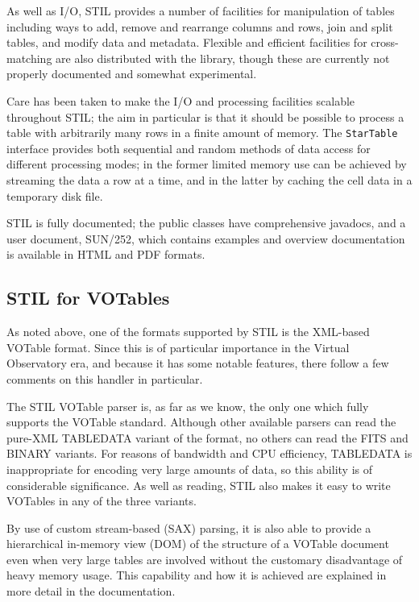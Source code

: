 \documentclass[11pt,twoside]{article}  %
\begin{document}
As well as I/O, STIL provides a number of facilities for manipulation 
of tables including ways to add, remove and rearrange columns and rows,
join and split tables, and modify data and metadata.
Flexible and efficient facilities for cross-matching are also distributed
with the library, though these are currently not properly documented
and somewhat experimental.

Care has been taken to make the I/O and processing facilities scalable
throughout STIL; the aim in particular is that it should be possible 
to process a table with arbitrarily many rows in a finite amount of memory.  
The {\tt StarTable} interface provides both sequential and random
methods of data access for different processing modes; 
in the former limited memory use can be achieved
by streaming the data a row at a time, and in the latter by
caching the cell data in a temporary disk file.

STIL is fully documented; the public classes have comprehensive javadocs,
and a user document, SUN/252, which contains examples and overview
documentation is available in HTML and PDF formats.

\subsection{STIL for VOTables}

As noted above, one of the formats supported by STIL is the XML-based
VOTable format.  Since this is of particular importance in the Virtual
Observatory era, and because it has some notable features, there follow
a few comments on this handler in particular.

The STIL VOTable parser is, as far as we know, the only one
which fully supports the VOTable standard.
Although other available parsers can read the pure-XML TABLEDATA variant
of the format, no others can read the FITS and BINARY variants.
For reasons of bandwidth and CPU efficiency, TABLEDATA is inappropriate
for encoding very large amounts of data, so this ability is of
considerable significance.  As well as reading,
STIL also makes it easy to write VOTables in any of the three variants.

By use of custom stream-based (SAX) parsing, it is also able to
provide a hierarchical in-memory view (DOM) of the structure of a 
VOTable document even when very large tables are involved without
the customary disadvantage of heavy memory usage.  This capability
and how it is achieved are explained in more detail in the documentation.
\end{document}
